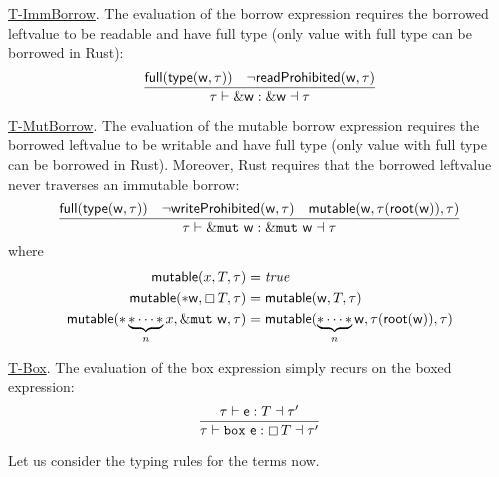 \underline{\textsf{T-ImmBorrow}}.
The evaluation of the borrow expression requires the borrowed leftvalue
to be readable and have full type
(only value with full type can be borrowed in Rust):
\[
\frac
    {\mathsf{full}(\mathsf{type}(\mathsf{w},\tau))\quad\neg\mathsf{readProhibited}(\mathsf{w},\tau)}
    {\tau\vdash\&\mathsf{w}:\&\mathsf{w}\dashv\tau}
\]

\underline{\textsf{T-MutBorrow}}.
The evaluation of the mutable borrow expression requires the borrowed
leftvalue to be writable and have full type
(only value with full type can be borrowed in Rust). Moreover, Rust requires that
the borrowed leftvalue never traverses an immutable borrow:
\[
\frac
    {\mathsf{full}(\mathsf{type}(\mathsf{w},\tau))\quad\neg\mathsf{writeProhibited}(\mathsf{w},\tau)
    \quad\mathsf{mutable}(\mathsf{w},\tau(\mathsf{root}(\mathsf{w})),\tau)}
    {\tau\vdash\&\mathtt{mut}\ \mathsf{w}:\&\mathtt{mut}\ \mathsf{w}\dashv\tau}
\]
where
\begin{align*}
  \mathsf{mutable}(x,T,\tau)&=\mathit{true}\\
  \mathsf{mutable}(\mathtt{*}\mathsf{w},\boxempty\,{T},\tau)&=\mathsf{mutable}(\mathsf{w},T,\tau)\\
  \mathsf{mutable}(\mathtt{*}\underbrace{\mathtt{*}\cdots\mathtt{*}}_nx,
  \&\mathtt{mut}\ \mathsf{w},\tau)&=\mathsf{mutable}(\underbrace{\mathtt{*}\cdots\mathtt{*}}_n\mathsf{w},
  \tau(\mathsf{root}(\mathsf{w})),\tau)
\end{align*}

\underline{\textsf{T-Box}}.
The evaluation of the box expression simply recurs on the boxed expression:
\[
\frac
    {\tau\vdash\mathsf{e}:T\dashv\tau'}
    {\tau\vdash\mathtt{box}\ \mathsf{e}:\boxtype{T}\dashv\tau'}
\]

Let us consider the typing rules for the terms now.
